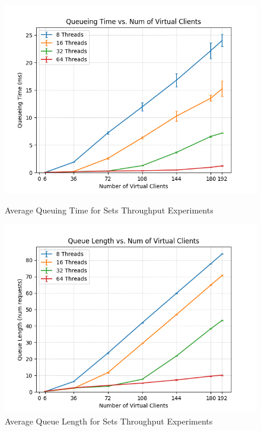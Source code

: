 \documentclass[11pt,a4paper]{article}
\begin{document}
\begin{figure}[H]
	\captionsetup{font=scriptsize,labelfont=scriptsize,justification=centering}
	\centering
	\begin{minipage}{0.5\textwidth}
		\centering
		\includegraphics[scale=0.5]{images/4_set_tps_q_wt.png}
		\caption{Average Queuing Time for Sets Throughput Experiments}		
	\end{minipage}\hfill
	\begin{minipage}{0.5\textwidth}
		\centering
		\includegraphics[scale=0.5]{images/4_set_tps_q_len.png}
		\caption{Average Queue Length for Sets Throughput Experiments}
	\end{minipage}
\end{figure}
\end{document}
